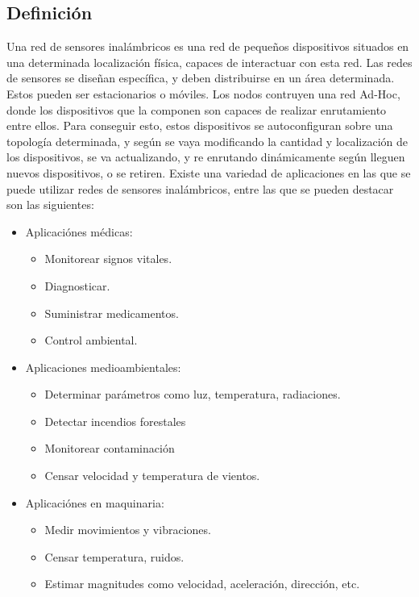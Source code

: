 \subsection{Definición}
Una red de sensores inalámbricos es una red de pequeños dispositivos situados en una determinada localización física, capaces de interactuar con esta red.
Las redes de sensores se diseñan específica, y deben distribuirse en un área determinada. Estos pueden ser estacionarios o móviles.
Los nodos contruyen una red Ad-Hoc, donde los dispositivos que la componen son capaces de realizar enrutamiento entre ellos. Para conseguir esto, estos dispositivos se autoconfiguran sobre una topología determinada, y según se vaya modificando la cantidad y localización de los dispositivos, se va actualizando, y re enrutando dinámicamente según lleguen nuevos dispositivos, o se retiren.
Existe una variedad de aplicaciones en las que se puede utilizar redes de sensores inalámbricos, entre las que se pueden destacar son las siguientes:

\begin{itemize}
    \item Aplicaciónes médicas:
    \begin{itemize}
        \item Monitorear signos vitales.
        \item Diagnosticar.
        \item Suministrar medicamentos.
        \item Control ambiental.
        \end{itemize}
    \item Aplicaciones medioambientales:
    \begin{itemize}
        \item Determinar parámetros como luz, temperatura, radiaciones.
        \item Detectar incendios forestales
        \item Monitorear contaminación
        \item Censar velocidad y temperatura de vientos.
        \end{itemize}
        
        \newpage
    \item Aplicaciónes en maquinaria:
    \begin{itemize}
        \item Medir movimientos y vibraciones.
        \item Censar temperatura, ruidos.
        \item Estimar magnitudes como velocidad, aceleración, dirección, etc.
        \end{itemize}
    \end{itemize}


